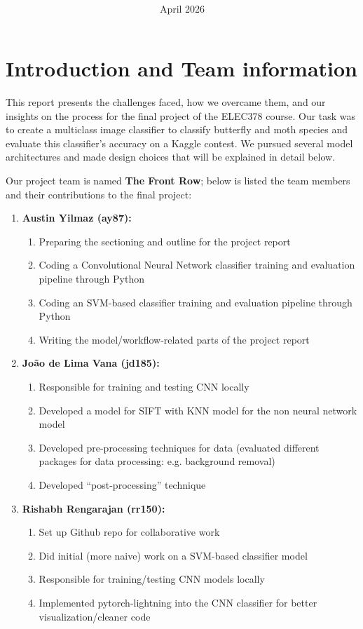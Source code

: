 \documentclass[10pt]{article} %
\title{}
\title{
    \textbf{\courseTitle} \\
    \textbf{\documentTitle} \\
    \date
    \bigskip
    \bigskip
    \bigskip
}
\author{\documentAuthor}
\date{April 2026}
\begin{document}
\maketitle

\newpage

\section{Introduction and Team information}
This report presents the challenges faced, how we overcame them, and our insights on the process for the final project of the ELEC378 course. Our task was to create a multiclass image classifier to classify butterfly and moth species and evaluate this classifier's accuracy on a Kaggle contest. We pursued several model architectures and made design choices that will be explained in detail below.

Our project team is named \textbf{The Front Row}; below is listed the team members and their contributions to the final project:\begin{enumerate}
    \item \textbf{Austin Yilmaz (ay87):}\begin{enumerate}
        \item Preparing the sectioning and outline for the project report
        \item Coding a Convolutional Neural Network classifier training and evaluation pipeline through Python
        \item Coding an SVM-based classifier training and evaluation pipeline through Python
        \item Writing the model/workflow-related parts of the project report
    \end{enumerate}
    \item \textbf{João de Lima Vana (jd185):}\begin{enumerate}
        \item Responsible for training and testing CNN locally
        \item Developed a model for SIFT with KNN model for the non neural network model
        \item Developed pre-processing techniques for data (evaluated different packages for data processing: e.g. background removal)
        \item Developed ``post-processing'' technique
    \end{enumerate}
    \item \textbf{Rishabh Rengarajan (rr150):}\begin{enumerate}
        \item Set up Github repo for collaborative work
        \item Did initial (more naive) work on a SVM-based classifier model
        \item Responsible for training/testing CNN models locally
        \item Implemented pytorch-lightning into the CNN classifier for better visualization/cleaner code
    \end{enumerate}
\end{enumerate}
\end{document}
